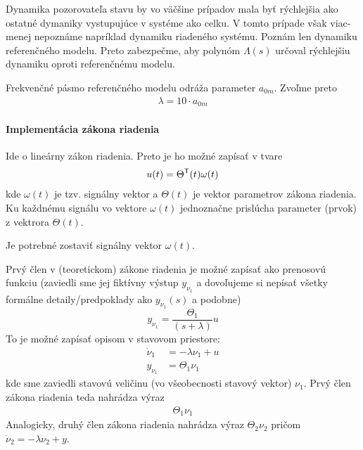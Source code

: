 \documentclass[a4paper, 10pt, ]{article}
\begin{document}
Dynamika pozorovateľa stavu by vo väčšine prípadov mala byť rýchlejšia ako ostatné dymaniky vystupujúce v systéme ako celku. V tomto prípade však viac-menej nepoznáme napríklad dynamiku riadeného systému. Poznám len dynamiku referenčného modelu. Preto zabezpečme, aby polynóm $\Lambda(s)$ určoval rýchlejšiu dynamiku oproti referenčnému modelu.

Frekvenčné pásmo referenčného modelu odráža parameter $a_{0m}$. Zvoľme preto
\begin{align}
    \lambda = 10 \cdot a_{0m}
\end{align}



\paragraph{Implementácia zákona riadenia}

Ide o lineárny zákon riadenia. Preto je ho možné zapísať v tvare
\begin{align}
    u(t) = \Theta^{\mathsf{T}}(t) \omega(t)
\end{align}
kde $\omega(t)$ je tzv. signálny vektor a $\Theta(t)$ je vektor parametrov zákona riadenia. Ku každnému signálu vo vektore $\omega(t)$ jednoznačne prislúcha parameter (prvok) z vektrora $\Theta(t)$.




Je potrebné zostaviť signálny vektor $\omega(t)$.

Prvý člen v (teoretickom) zákone riadenia je možné zapísať ako prenosovú funkciu (zaviedli sme jej fiktívny výstup $y_{\nu_1}$ a dovoľujeme si nepísať všetky formálne detaily/predpoklady ako $y_{\nu_1}${\color{Gray}$(s)$} a podobne)
\begin{equation}
	y_{\nu_1} =   \frac{\Theta_1}{(s + \lambda)} u
\end{equation}
To je možné zapísať opisom v stavovom priestore:
\begin{subequations}
    \begin{align}
         \dot \nu_1 &= -\lambda \nu_1 + u \\
         y_{\nu_1} &= \Theta_1 \nu_1
    \end{align}
\end{subequations}
kde sme zaviedli stavovú veličinu (vo všeobecnosti stavový vektor) $\nu_1$. Prvý člen zákona riadenia teda nahrádza výraz
\begin{align}
     \Theta_1 \nu_1
\end{align}
Analogicky, druhý člen zákona riadenia nahrádza výraz $\Theta_2 \nu_2$ pričom $\dot \nu_2 = -\lambda \nu_2 + y$.
\end{document}
